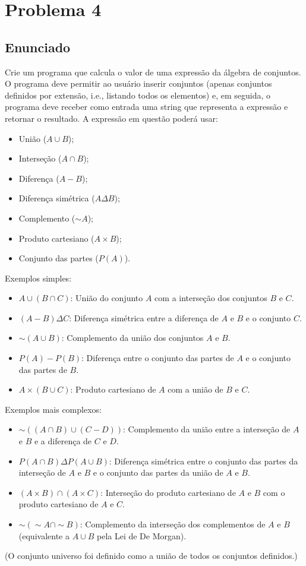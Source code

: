 \documentclass[a4paper, 11pt]{scrartcl}
\begin{document}
\section*{Problema 4}

\subsection*{Enunciado}
Crie um programa que calcula o valor de uma expressão da álgebra de conjuntos. O programa
deve permitir ao usuário inserir conjuntos (apenas conjuntos definidos por extensão, i.e., listando
todos os elementos) e, em seguida, o programa deve receber como entrada uma string que
representa a expressão e retornar o resultado. A expressão em questão poderá usar:
\begin{itemize}
    \item União ($A \cup B$);
    \item Interseção ($A \cap B$);
    \item Diferença ($A - B$);
    \item Diferença simétrica ($A \Delta B$);
    \item Complemento ($\sim A$);
    \item Produto cartesiano ($A \times B$);
    \item Conjunto das partes ($P(A)$).
\end{itemize}
Exemplos simples:
\begin{itemize}
    \item $A \cup (B \cap C)$: União do conjunto $A$ com a interseção dos conjuntos $B$ e $C$.
    \item $(A - B) \Delta C$: Diferença simétrica entre a diferença de $A$ e $B$ e o conjunto $C$.
    \item $\sim(A \cup B)$: Complemento da união dos conjuntos $A$ e $B$.
    \item $P(A) - P(B)$: Diferença entre o conjunto das partes de $A$ e o conjunto das partes de $B$.
    \item $A \times (B \cup C)$: Produto cartesiano de $A$ com a união de $B$ e $C$.
\end{itemize}
Exemplos mais complexos:
\begin{itemize}
    \item $\sim((A \cap B) \cup (C - D))$: Complemento da união entre a interseção de $A$ e $B$ e a diferença
de $C$ e $D$.
    \item $P(A \cap B) \Delta P(A \cup B)$: Diferença simétrica entre o conjunto das partes da interseção de
$A$ e $B$ e o conjunto das partes da união de $A$ e $B$.
    \item $(A \times B) \cap (A \times C)$: Interseção do produto cartesiano de $A$ e $B$ com o produto cartesiano
de $A$ e $C$.
    \item $\sim(\sim A \cap \sim B)$: Complemento da interseção dos complementos de $A$ e $B$ (equivalente a $A \cup B$
pela Lei de De Morgan).
\end{itemize}
(O conjunto universo foi definido como a união de todos os conjuntos definidos.)
\end{document}
